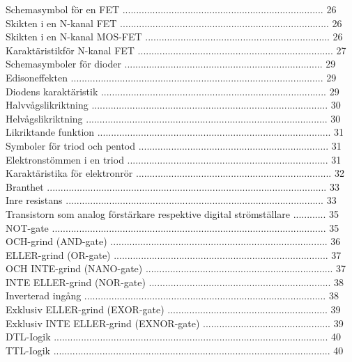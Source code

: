 Schemasymbol för en FET .......................................................................... 26
Skikten i en N-kanal FET ............................................................................. 26
Skikten i en N-kanal MOS-FET .................................................................... 26
Karaktäristikför N-kanal FET ........................................................................ 27
Schemasymboler för dioder ......................................................................... 29
Edisoneffekten ............................................................................................. 29
Diodens karaktäristik ................................................................................... 29
Halvvågslikriktning ....................................................................................... 30
Helvågslikriktning ......................................................................................... 30
Likriktande funktion ...................................................................................... 31
Symboler för triod och pentod ...................................................................... 31
Elektronstömmen i en triod .......................................................................... 31
Karaktäristika för elektronrör ........................................................................ 32
Branthet ....................................................................................................... 33
Inre resistans ............................................................................................... 33
Transistorn som analog förstärkare respektive digital strömställare ............ 35
NOT-gate ..................................................................................................... 35
OCH-grind (AND-gate) ................................................................................ 36
ELLER-grind (OR-gate) ............................................................................... 37
OCH INTE-grind (NANO-gate) ..................................................................... 37
INTE ELLER-grind (NOR-gate) ................................................................... 38
Inverterad ingång ......................................................................................... 38
Exklusiv ELLER-grind (EXOR-gate) ........................................................... 39
Exklusiv INTE ELLER-grind (EXNOR-gate) ............................................... 39
DTL-Iogik ..................................................................................................... 40
TTL-Iogik ...................................................................................................... 40

